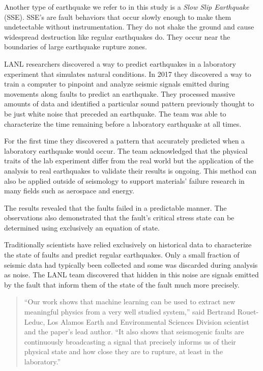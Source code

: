 \documentclass[]{llncs}
\begin{document}
Another type of earthquake we refer to in this study is a {\em Slow Slip Earthquake} (SSE). SSE's are fault behaviors that occur slowly enough to make them undetectable without instrumentation. They do not shake the ground and cause widespread destruction like regular earthquakes do. They occur near the boundaries of large earthquake rupture zones\cite{Slip}. \par

LANL researchers discovered a way to predict earthquakes in a laboratory experiment that simulates natural conditions. In 2017 they discovered a way to train a computer to pinpoint and analyze seismic signals emitted during movements along faults to predict an earthquake. They processed massive amounts of data and identified a particular sound pattern previously thought to be just white noise that preceded an earthquake. The team was able to characterize the time remaining before a laboratory earthquake at all times\cite{LANLNews}. \par


For the first time they discovered a pattern that accurately predicted when a laboratory earthquake would occur. The team acknowledged that the physical traits of the lab experiment differ from the real world but the application of the analysis to real earthquakes to validate their results is ongoing. This method can also be applied outside of seismology to support materials’ failure research in many fields such as aerospace and energy\cite{LANLNews}.\par

The results revealed that the faults failed in a predictable manner. The observations also demonstrated that the fault’s critical stress state can be determined using exclusively an equation of state\cite{LANLNews}.\par

Traditionally scientists have relied exclusively on historical data to  characterize the state of faults and predict regular earthquakes. Only a small fraction of seismic data had typically been collected and some was discarded during analysis as noise. The LANL team discovered that hidden in this noise are signals emitted by the fault that inform them of the state of the fault much more precisely\cite{LANLNews}.\par
\begin{quote}
“Our work shows that machine learning can be used to extract new meaningful physics from a very well studied system,” said Bertrand Rouet-Leduc, Los Alamos Earth and Environmental Sciences Division scientist and the paper’s lead author. “It also shows that seismogenic faults are continuously broadcasting a signal that precisely informs us of their physical state and how close they are to rupture, at least in the laboratory.”
\end{quote}
\end{document}
